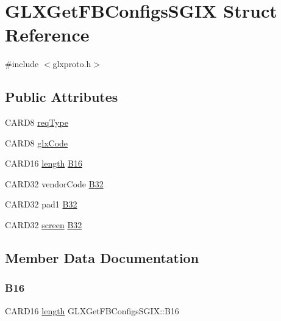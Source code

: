 \hypertarget{struct_g_l_x_get_f_b_configs_s_g_i_x}{}\section{G\+L\+X\+Get\+F\+B\+Configs\+S\+G\+IX Struct Reference}
\label{struct_g_l_x_get_f_b_configs_s_g_i_x}


{\ttfamily \#include $<$glxproto.\+h$>$}

\subsection*{Public Attributes}
\begin{DoxyCompactItemize}
\item 
C\+A\+R\+D8 \hyperlink{struct_g_l_x_get_f_b_configs_s_g_i_x_a2a47343208cb882772680ea25460c220}{req\+Type}
\item 
C\+A\+R\+D8 \hyperlink{struct_g_l_x_get_f_b_configs_s_g_i_x_ae2451d7f1cf007ce05ad9cba6f27724e}{glx\+Code}
\item 
C\+A\+R\+D16 \hyperlink{glcorearb_8h_ab9c919755bde3b34349e23a32b4e0fa7}{length} \hyperlink{struct_g_l_x_get_f_b_configs_s_g_i_x_a4de96740f8180806347b4fa3f98a53ae}{B16}
\item 
C\+A\+R\+D32 vendor\+Code \hyperlink{struct_g_l_x_get_f_b_configs_s_g_i_x_a2b52d2e909964ac730bc6f46e1c7c4c7}{B32}
\item 
C\+A\+R\+D32 pad1 \hyperlink{struct_g_l_x_get_f_b_configs_s_g_i_x_ac4b85d82fc6b7964db41bf5fbdc53930}{B32}
\item 
C\+A\+R\+D32 \hyperlink{cad_8h_ae04e09e4e3831bfc1632c509ae37dcec}{screen} \hyperlink{struct_g_l_x_get_f_b_configs_s_g_i_x_a496774e666fc3cf5e973c1b6758c5d55}{B32}
\end{DoxyCompactItemize}


\subsection{Member Data Documentation}
\mbox{\label{struct_g_l_x_get_f_b_configs_s_g_i_x_a4de96740f8180806347b4fa3f98a53ae}} 
\subsubsection{\texorpdfstring{B16}{B16}}
{\footnotesize\ttfamily C\+A\+R\+D16 \hyperlink{glcorearb_8h_ab9c919755bde3b34349e23a32b4e0fa7}{length} G\+L\+X\+Get\+F\+B\+Configs\+S\+G\+I\+X\+::\+B16}

